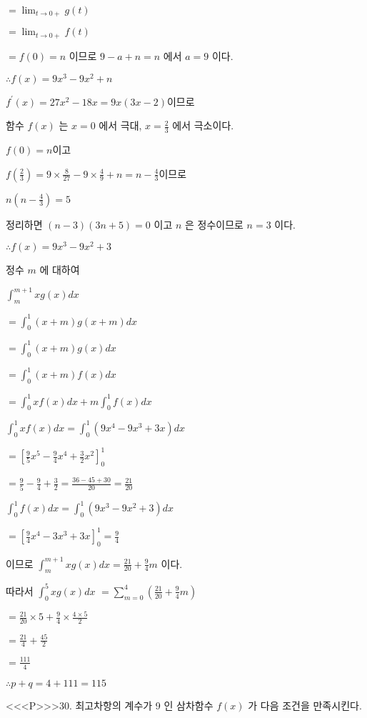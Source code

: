 \documentclass{oblivoir}
\begin{document}
$=\lim _{t \rightarrow 0+} g(t)$

$=\lim _{t \rightarrow 0+} f(t)$

$=f(0)=n$ 이므로 $9-a+n=n$ 에서 $a=9$ 이다.

$\therefore f(x)=9 x^{3}-9 x^{2}+n$

$f^{\prime}(x)=27 x^{2}-18 x=9 x(3 x-2)$이므로

함수 $f(x)$ 는 $x=0$ 에서 극대, $x=\frac{2}{3}$ 에서 극소이다.

$f(0)=n$이고

$f\left(\frac{2}{3}\right)=9 \times \frac{8}{27}-9 \times \frac{4}{9}+n=n-\frac{4}{3}$이므로

$n\left(n-\frac{4}{3}\right)=5$

정리하면 $(n-3)(3 n+5)=0$ 이고 $n$ 은 정수이므로 $n=3$ 이다.

$\therefore f(x)=9 x^{3}-9 x^{2}+3$

정수 $m$ 에 대하여

$\int_{m}^{m+1} x g(x) d x$

$=\int_{0}^{1}(x+m) g(x+m) d x$

$=\int_{0}^{1}(x+m) g(x) d x$

$=\int_{0}^{1}(x+m) f(x) d x$

$=\int_{0}^{1} x f(x) d x+m \int_{0}^{1} f(x) d x$

$\int_{0}^{1} x f(x) d x=\int_{0}^{1}\left(9 x^{4}-9 x^{3}+3 x\right) d x$

$=\left[\frac{9}{5} x^{5}-\frac{9}{4} x^{4}+\frac{3}{2} x^{2}\right]_{0}^{1}$

$=\frac{9}{5}-\frac{9}{4}+\frac{3}{2}=\frac{36-45+30}{20}=\frac{21}{20}$

$\int_{0}^{1} f(x) d x=\int_{0}^{1}\left(9 x^{3}-9 x^{2}+3\right) d x$

$=\left[\frac{9}{4} x^{4}-3 x^{3}+3 x\right]_{0}^{1}=\frac{9}{4}$

이므로 $\int_{m}^{m+1} x g(x) d x=\frac{21}{20}+\frac{9}{4} m$ 이다.

따라서 $\int_{0}^{5} x g(x) d x $
$=\sum_{m=0}^{4}\left(\frac{21}{20}+\frac{9}{4} m\right)$

$=\frac{21}{20} \times 5+\frac{9}{4} \times \frac{4 \times 5}{2}$

$=\frac{21}{4}+\frac{45}{2}$

$=\frac{111}{4}$

$\therefore p+q=4+111=115$


<<<P>>>30. 최고차항의 계수가 9 인 삼차함수 $f(x)$ 가 다음 조건을 만족시킨다.
\end{document}
